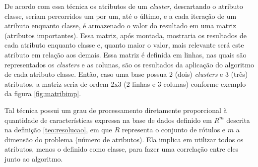 
De acordo com essa técnica os atributos de um \textit{cluster}, descartando o atributo classe, seriam percorridos um por um, até o último, e a cada iteração de um atributo enquanto classe, é armazenado o valor do resultado em uma matriz (atributos importantes). Essa matriz, após montada, mostraria os resultados de cada atributo enquanto classe e, quanto maior o valor, mais relevante será este atributo em relação aos demais. Essa matriz é definida em linhas, nas quais são representados os \textit{clusters} e  as colunas, são os resultados da aplicação do algoritmo de cada atributo classe. Então, caso uma base possua 2 (dois) \textit{clusters} e 3 (três) atributos, a matriz seria de ordem 2x3 (2 linhas e 3 colunas) conforme exemplo da figura  \ref{fig:matribimp}.



Tal técnica possui um grau de processamento diretamente proporcional à quantidade de características expressa na base de dados definido em ${R^m}$ descrita na definição  \ref{teo:resolucao}, em que ${R}$ representa o conjunto de rótulos e ${m}$ a dimensão do problema (número de atributos). Ela implica em utilizar todos os atributos, menos o definido como classe, para fazer uma correlação entre eles junto ao algoritmo. 



